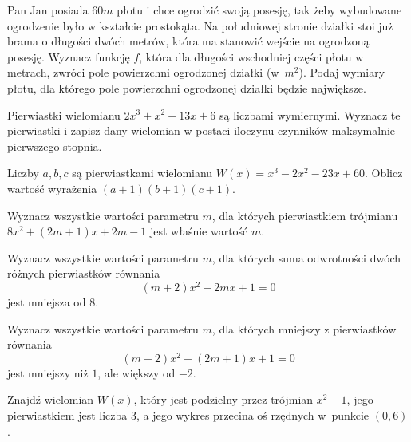 \zadanie Pan Jan posiada $60m$ płotu i chce ogrodzić swoją posesję, tak żeby wybudowane ogrodzenie było w kształcie prostokąta. Na południowej stronie działki stoi już brama o długości dwóch metrów, która ma stanowić wejście na ogrodzoną posesję. Wyznacz funkcję $f$, która dla długości wschodniej części płotu w metrach, zwróci pole powierzchni ogrodzonej działki (w~$m^2$). Podaj wymiary płotu, dla którego pole powierzchni ogrodzonej działki będzie największe. %

\zadanie Pierwiastki wielomianu $2x^3 + x^2 - 13x + 6$ są liczbami wymiernymi. Wyznacz te pierwiastki i zapisz dany wielomian w postaci iloczynu czynników maksymalnie pierwszego stopnia. %

\zadanie Liczby $a, b, c$ są pierwiastkami wielomianu $W(x) = x^3 - 2x^2 - 23x + 60$. Oblicz wartość wyrażenia $(a + 1)(b + 1)(c + 1)$. %

\zadanie Wyznacz wszystkie wartości parametru $m$, dla których pierwiastkiem trójmianu $8x^2+(2m+1)x+2m-1$ jest właśnie wartość $m$. %

\zadanie Wyznacz wszystkie wartości parametru $m$, dla których suma odwrotności dwóch różnych pierwiastków równania \[ {(m+2)x^2+2mx+1=0} \] jest mniejsza od $8$.

\zadanie Wyznacz wszystkie wartości parametru $m$, dla których mniejszy z pierwiastków równania \[ (m-2)x^2+(2m+1)x+1=0 \] jest mniejszy niż $1$, ale większy od $-2$.

\zadanie Znajdź wielomian $W(x)$, który jest podzielny przez trójmian $x^2 - 1$, jego pierwiastkiem jest liczba $3$, a jego wykres przecina oś rzędnych w~punkcie $(0, 6)$. %